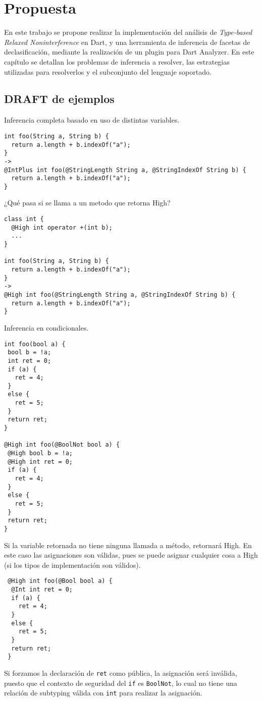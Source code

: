 \chapter{Propuesta}

En este trabajo se propone realizar la implementación del análisis de \textit{Type-based Relaxed Noninterference} en Dart, y una herramienta de inferencia de facetas de declasificación, mediante la realización de un plugin para Dart Analyzer. En este capítulo se detallan los problemas de inferencia a resolver, las estrategias utilizadas para resolverlos y el subconjunto del lenguaje soportado.

\section{DRAFT de ejemplos}

Inferencia completa basado en uso de distintas variables.
 \begin{lstlisting}
int foo(String a, String b) {
  return a.length + b.indexOf("a");
}
->
@IntPlus int foo(@StringLength String a, @StringIndexOf String b) {
  return a.length + b.indexOf("a");
}
 \end{lstlisting}

¿Qué pasa si se llama a un metodo que retorna High?

 \begin{lstlisting}
class int {
  @High int operator +(int b);
  ...
}

int foo(String a, String b) {
  return a.length + b.indexOf("a");
}
->
@High int foo(@StringLength String a, @StringIndexOf String b) {
  return a.length + b.indexOf("a");
}
 \end{lstlisting}

 Inferencia en condicionales.

 \begin{lstlisting}
int foo(bool a) {
 bool b = !a;
 int ret = 0;
 if (a) {
   ret = 4;
 }
 else {
   ret = 5;
 }
 return ret;
}

@High int foo(@BoolNot bool a) {
 @High bool b = !a;
 @High int ret = 0;
 if (a) {
   ret = 4;
 }
 else {
   ret = 5;
 }
 return ret;
}
 \end{lstlisting}

  Si la variable retornada no tiene ninguna llamada a método, retornará High. En este caso las asignaciones son válidas, pues se puede asignar cualquier cosa a High (si los tipos de implementación son válidos).

  \begin{lstlisting}
 @High int foo(@Bool bool a) {
  @Int int ret = 0;
  if (a) {
    ret = 4;
  }
  else {
    ret = 5;
  }
  return ret;
 }
  \end{lstlisting}

  Si forzamos la declaración de \texttt{ret} como pública, la asignación será inválida, puesto que el contexto de seguridad del \texttt{if} es \texttt{BoolNot}, lo cual no tiene una relación de subtyping válida con \texttt{int} para realizar la asignación.
